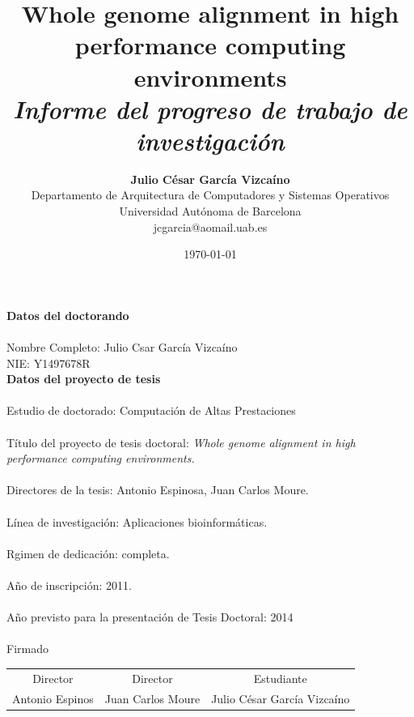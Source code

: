 \documentclass[12pt,a4paper]{article}
\title{ {\bf Whole genome alignment in high performance computing environments} \\
\it Informe del progreso de trabajo de investigaci\'on}
\author{ {\bf Julio C\'esar Garc\'ia Vizca\'ino}  \\ 
Departamento de Arquitectura de Computadores y Sistemas Operativos \\ 
Universidad Aut\'onoma de Barcelona\\ 
{\small jcgarcia@aomail.uab.es} 
}
\date{\today}
\begin{document}
\pagestyle{plain}
\maketitle
\pagebreak
{\Huge{\bf Datos del doctorando}}\\
{\Large \\Nombre Completo: Julio Csar García Vizcaíno\\}
\vspace{0.3cm}
{\Large NIE: Y1497678R\\}
{\Huge{\bf Datos del proyecto de tesis}}\\
\vspace{0.3cm}
{\Large \\Estudio de doctorado: Computación de Altas Prestaciones\\}
\vspace{0.3cm}
{\Large \\Título del proyecto de tesis doctoral: \emph{
Whole genome alignment in high performance computing environments.}\\}
\vspace{0.3cm}
{\Large \\Directores de la tesis: Antonio Espinosa, Juan Carlos Moure.\\}
\vspace{0.3cm}
{\Large \\Línea de investigación: Aplicaciones bioinformáticas.\\}
\vspace{0.3cm}
{\Large \\Rgimen de dedicación: completa.\\}
\vspace{0.3cm}
{\Large \\A\~no de inscripci\'on: 2011.\\}
\vspace{0.3cm}
{\Large \\A\~no previsto para la presentaci\'on de Tesis Doctoral: 2014\\}
\vspace{0.3cm}
{\large \\Firmado\\}
\vspace{2.8cm}
\begin{center}
\begin{tabular}{ c c c }
Director & Director & Estudiante\\
Antonio Espinos & Juan Carlos Moure & Julio C\'esar García Vizcaíno\\
\end{tabular}
\end{center}
\pagebreak
\cleardoublepage
{}
\end{document}
